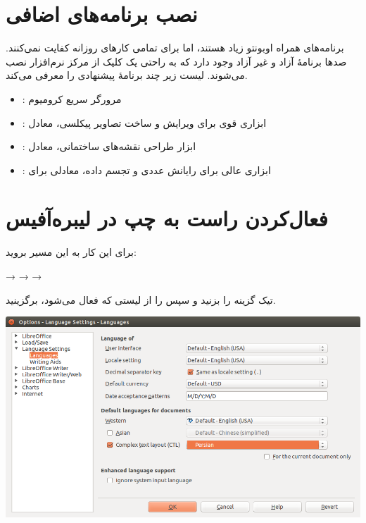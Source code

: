 \section{نصب برنامه‌های اضافی}
برنامه‌های همراه اوبونتو زیاد هستند، اما برای تمامی کارهای روزانه کفایت نمی‌کنند. صدها برنامهٔ آزاد و غیر آزاد وجود دارد که به راحتی یک کلیک از مرکز نرم‌افزار نصب می‌شوند. لیست زیر چند برنامهٔ پیشنهادی را معرفی می‌کند.
\begin{itemize}
\item {}: مرورگر سریع کرومیوم
\item {}: ابزاری قوی برای ویرایش و ساخت تصاویر پیکلسی، معادل 
\item {}: ابزار طراحی نقشه‌های ساختمانی، معادل 
\item {}: ابزاری عالی برای رایانش عددی و تجسم داده، معادلی برای 
\end{itemize}

\section{فعال‌کردن راست به چپ در لیبره‌آفیس}
برای این کار به این مسیر بروید:\\

\begin{center}
 \textsf{→}  \textsf{→}  \textsf{→} \\
\end{center}

تیک گزینه  را بزنید و سپس  را از لیستی که فعال می‌شود، برگزینید.

\begin{center}
\includegraphics[scale=0.55]{pics/31.png}
\end{center}

